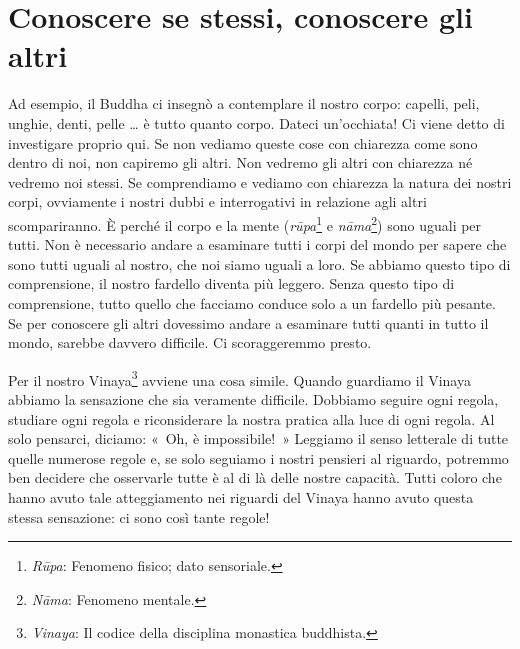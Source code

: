 \section{Conoscere se stessi, conoscere gli altri}

Ad esempio, il Buddha ci insegnò a contemplare il nostro corpo: capelli,
peli, unghie, denti, pelle \ldots{} è tutto quanto corpo. Dateci
un'occhiata! Ci viene detto di investigare proprio qui. Se non vediamo
queste cose con chiarezza come sono dentro di noi, non capiremo gli
altri. Non vedremo gli altri con chiarezza né vedremo noi stessi. Se
comprendiamo e vediamo con chiarezza la natura dei nostri corpi,
ovviamente i nostri dubbi e interrogativi in relazione agli altri
scompariranno. È perché il corpo e la mente (\emph{rūpa}\footnote{\emph{Rūpa}:
  Fenomeno fisico; dato sensoriale.} e \emph{nāma}\footnote{\emph{Nāma}:
  Fenomeno mentale.}) sono uguali per tutti. Non è necessario andare a
esaminare tutti i corpi del mondo per sapere che sono tutti uguali al
nostro, che noi siamo uguali a loro. Se abbiamo questo tipo di
comprensione, il nostro fardello diventa più leggero. Senza questo tipo
di comprensione, tutto quello che facciamo conduce solo a un fardello
più pesante. Se per conoscere gli altri dovessimo andare a esaminare
tutti quanti in tutto il mondo, sarebbe davvero difficile. Ci
scoraggeremmo presto.

Per il nostro Vinaya\footnote{\emph{Vinaya}: Il codice della disciplina
  monastica buddhista.} avviene una cosa simile. Quando guardiamo il
Vinaya abbiamo la sensazione che sia veramente difficile. Dobbiamo
seguire ogni regola, studiare ogni regola e riconsiderare la nostra
pratica alla luce di ogni regola. Al solo pensarci, diciamo: «~Oh, è
impossibile!~» Leggiamo il senso letterale di tutte quelle numerose
regole e, se solo seguiamo i nostri pensieri al riguardo, potremmo ben
decidere che osservarle tutte è al di là delle nostre capacità. Tutti
coloro che hanno avuto tale atteggiamento nei riguardi del Vinaya hanno
avuto questa stessa sensazione: ci sono così tante regole!

